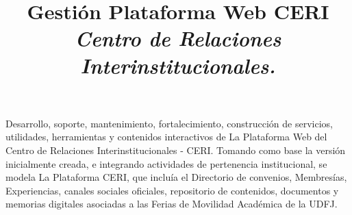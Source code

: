 \documentclass[overlapped,line,final,letterpaper]{res}
\begin{document}
\begin{resume}
\title{\bf Gestión Plataforma Web CERI
	\newline \em Centro de Relaciones Interinstitucionales.
}
\begin{position}
Desarrollo, soporte, mantenimiento, fortalecimiento, construcción de servicios, utilidades, herramientas y contenidos interactivos de La Plataforma Web del Centro de Relaciones Interinstitucionales - CERI. Tomando como base la versión inicialmente creada, e integrando actividades de pertenencia institucional, se modela La Plataforma CERI, que incluía el Directorio de convenios, Membresías, Experiencias, canales sociales oficiales, repositorio de contenidos, documentos y memorias digitales asociadas a las Ferias de Movilidad Académica de la UDFJ.
\end{position} 




\end{resume}
\end{document}
